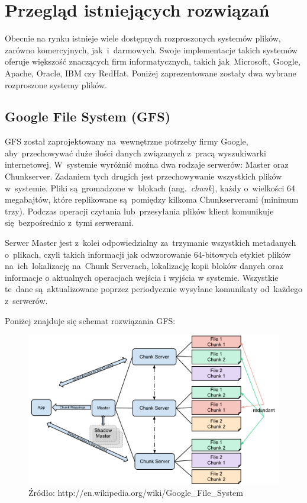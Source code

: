 \chapter[Przegląd istniejących rozwiązań][Przegląd istniejących
rozwiązań]{Przegląd istniejących rozwiązań}
Obecnie na rynku istnieje wiele dostępnych rozproszonych systemów plików,
zarówno komercyjnych, jak~i~darmowych. Swoje implementacje takich systemów
oferuje większość znaczących firm informatycznych, takich jak~Microsoft,
Google, Apache, Oracle, IBM czy RedHat. Poniżej zaprezentowane zostały dwa
wybrane rozproszone systemy plików.

\section[Google File System (GFS)][Google File System (GFS)]{Google File System
(GFS)}
GFS został zaprojektowany na~wewnętrzne potrzeby firmy Google, aby~przechowywać
duże ilości danych związanych z~pracą wyszukiwarki internetowej. W~systemie
wyróżnić można dwa rodzaje serwerów: Master oraz Chunkserver. Zadaniem tych
drugich jest przechowywanie wszystkich plików w~systemie. Pliki są~gromadzone
w~blokach (ang.~\emph{chunk}), każdy o~wielkości 64 megabajtów, które
replikowane są~pomiędzy kilkoma Chunkserverami (minimum trzy). Podczas operacji
czytania lub~przesyłania plików klient komunikuje się~bezpośrednio z~tymi serwerami.

\vspace{5mm}
Serwer Master jest z~kolei odpowiedzialny za~trzymanie wszystkich metadanych
o~plikach, czyli takich informacji jak odwzorowanie 64-bitowych etykiet plików
na~ich~lokalizację na~Chunk Serverach, lokalizację kopii bloków danych oraz
informacje o aktualnych operacjach wejścia i wyjścia w systemie. Wszystkie
te~dane są~aktualizowane poprzez periodycznie wysyłane komunikaty od~każdego z~serwerów.

\vspace{5mm}
Poniżej znajduje się schemat rozwiązania GFS:

\begin{figure}[H]
\center
\flushleft
\includegraphics[keepaspectratio=true, scale=0.9]{img/gfs.png}
\caption{Źródło: http://en.wikipedia.org/wiki/Google\_File\_System}
\label{fig:gfs}
\end{figure}

